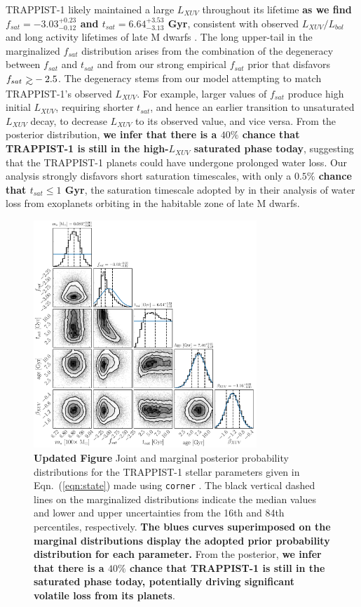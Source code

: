 \documentclass[twocolumn]{aastex62}
\def\gsim{~\rlap{$>$}{\lower 1.0ex\hbox{$\sim$}}}
\newcommand{\xxx}[1]{{\textbf{#1}}}
\begin{document}
TRAPPIST-1 likely maintained a large $L_{XUV}$ throughout its lifetime \xxx{as we find $f_{sat} = -3.03^{+0.23}_{-0.12}$ and $t_{sat} = 6.64^{+3.53}_{-3.13}$ Gyr}, consistent with observed $L_{XUV}/L_{bol}$ and long activity lifetimes of late M dwarfs \citep{West2008,Wright2018}. The long upper-tail in the marginalized $f_{sat}$ distribution arises from the combination of the degeneracy between $f_{sat}$ and $t_{sat}$ and from our strong empirical $f_{sat}$ prior that disfavors $f_{sat} \gsim -2.5$. The degeneracy stems from our model attempting to match TRAPPIST-1's observed $L_{XUV}$. For example, larger values of $f_{sat}$ produce high initial $L_{XUV}$, requiring shorter $t_{sat}$, and hence an earlier transition to unsaturated $L_{XUV}$ decay, to decrease $L_{XUV}$ to its observed value, and vice versa. From the posterior distribution, \xxx{we infer that there is a $40\%$ chance that TRAPPIST-1 is still in the high-$L_{XUV}$ saturated phase today}, suggesting that the TRAPPIST-1 planets could have undergone prolonged water loss. Our analysis strongly disfavors short saturation timescales, with only a \xxx{$0.5\%$ chance that $t_{sat} \leq 1$ Gyr}, the saturation timescale adopted by \citet{Luger2015} in their analysis of water loss from exoplanets orbiting in the habitable zone of late M dwarfs.

\begin{figure}[t]
\centering
	\includegraphics[width=0.75\textwidth]{../Analysis/Corner/trappist1Corner.pdf}
   \caption{\xxx{Updated Figure} Joint and marginal posterior probability distributions for the TRAPPIST-1 stellar parameters given in Eqn.~(\ref{eqn:state}) made using \texttt{corner} \citep{ForemanMackey2016}. The black vertical dashed lines on the marginalized distributions indicate the median values and lower and upper uncertainties from the 16th and 84th percentiles, respectively. \xxx{The blues curves superimposed on the marginal distributions display the adopted prior probability distribution for each parameter.} From the posterior, \xxx{we infer that there is a $40\%$ chance that TRAPPIST-1 is still in the saturated phase today, potentially driving significant volatile loss from its planets}.}%
    \label{fig:corner}%
\end{figure}
\end{document}
